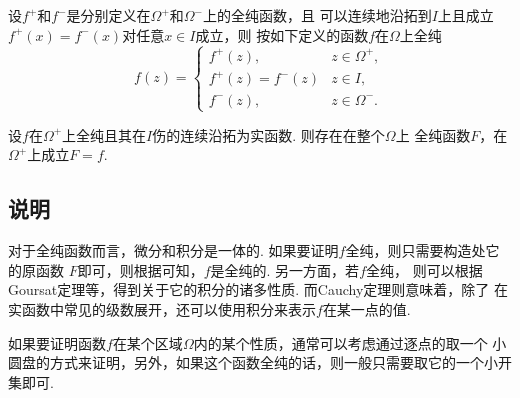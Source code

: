   \begin{thm}
    设$f^+$和$f^-$是分别定义在$\Omega^+$和$\Omega^-$上的全纯函数，且
    可以连续地沿拓到$I$上且成立$f^+(x)=f^-(x)$对任意$x\in I$成立，则
    按如下定义的函数$f$在$\Omega$上全纯
    \[
      f(z)=
      \begin{cases}
        f^+(z), &z\in\Omega^+, \\
        f^+(z)=f^-(z) &z\in I, \\
        f^-(z), & z\in\Omega^-.
      \end{cases}
    \]
  \end{thm}

  \begin{thm}[Schwarz镜像原理]
    设$f$在$\Omega^+$上全纯且其在$I$伤的连续沿拓为实函数. 则存在在整个$\Omega$上
    全纯函数$F$，在$\Omega^+$上成立$F=f$.
  \end{thm}

\subsection{说明}
  对于全纯函数而言，微分和积分是一体的. 如果要证明$f$全纯，则只需要构造处它的原函数
  $F$即可，则根据可知，$f$是全纯的. 另一方面，若$f$全纯，
  则可以根据Goursat定理等，得到关于它的积分的诸多性质. 而Cauchy定理则意味着，除了
  在实函数中常见的级数展开，还可以使用积分来表示$f$在某一点的值. \par
  如果要证明函数$f$在某个区域$\Omega$内的某个性质，通常可以考虑通过逐点的取一个
  小圆盘的方式来证明，另外，如果这个函数全纯的话，则一般只需要取它的一个小开集即可.
